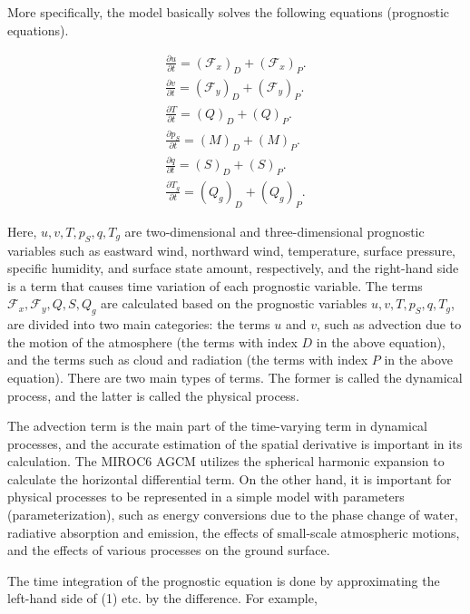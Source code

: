 More specifically, the model basically solves the following equations
(prognostic equations).

\begin{eqnarray}
  \frac{\partial{u}}{\partial {t}}  =  \left( {\mathcal F}_x \right)_D + \left( {\mathcal F}_x \right)_P.
   \\
  \frac{\partial{v}}{\partial {t}}  =  \left( {\mathcal F}_y \right)_D + \left( {\mathcal F}_y \right)_P. \\
  \frac{\partial{T}}{\partial {t}}  =  \left( Q \right)_D + \left( Q \right)_P. \\
  \frac{\partial{p_S}}{\partial {t}}  =  \left( M \right)_D + \left( M \right)_P. \\
  \frac{\partial{q}}{\partial {t}}  =  \left( S \right)_D + \left( S \right)_P. \\
  \frac{\partial{T_g}}{\partial {t}}  =  \left( Q_g \right)_D + \left( Q_g \right)_P.
\end{eqnarray}

Here, \(u,v,T,p_S,q,T_g\) are two-dimensional and three-dimensional
prognostic variables such as eastward wind, northward wind, temperature,
surface pressure, specific humidity, and surface state amount,
respectively, and the right-hand side is a term that causes time
variation of each prognostic variable. The terms
\({\mathcal F}_x,{\mathcal F}_y,Q,S,Q_g\) are calculated based on the
prognostic variables \(u,v,T,p_S,q,T_g\), are divided into two main
categories: the terms \(u\) and \(v\), such as advection due to the
motion of the atmosphere (the terms with index \(D\) in the above
equation), and the terms such as cloud and radiation (the terms with
index \(P\) in the above equation). There are two main types of terms.
The former is called the dynamical process, and the latter is called the
physical process.

The advection term is the main part of the time-varying term in
dynamical processes, and the accurate estimation of the spatial
derivative is important in its calculation. The MIROC6 AGCM utilizes the
spherical harmonic expansion to calculate the horizontal differential
term. On the other hand, it is important for physical processes to be
represented in a simple model with parameters (parameterization), such
as energy conversions due to the phase change of water, radiative
absorption and emission, the effects of small-scale atmospheric motions,
and the effects of various processes on the ground surface.

The time integration of the prognostic equation is done by approximating
the left-hand side of (1) etc. by the difference. For example,


